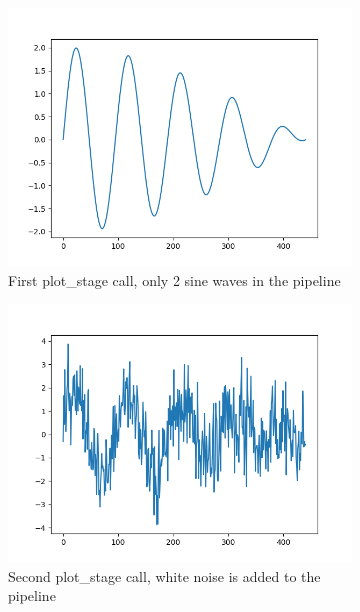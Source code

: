 \documentclass[margin,line,a4paper,authoryear,12pt]{report}
\begin{document}
\begin{figure}[h!]
    \begin{subfigure}{0.3\linewidth}
        \centering
        \includegraphics[width=\linewidth]{oop_two_sines.png}
        \caption{First plot\_stage call, only 2 sine waves in the pipeline}
        \label{fig:SonarCloud}
    \end{subfigure}
    \begin{subfigure}{0.3\linewidth}
        \centering
        \includegraphics[width=\linewidth]{oop_two_sines_noise.png}
        \caption{Second plot\_stage call, white noise is added to the pipeline }
        \label{fig:SonarCloud}
    \end{subfigure}
    \begin{subfigure}{0.3\linewidth}

\end{subfigure}
\end{figure}
\end{document}
